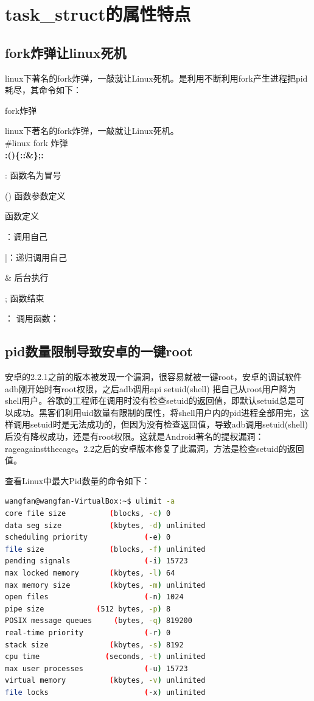  

 



\section{task\_struct的属性特点}
\subsection{fork炸弹让linux死机}
linux下著名的fork炸弹，一敲就让Linux死机。是利用不断利用fork产生进程把pid耗尽，其命令如下：
\begin{example*}
  \wdexpbox
  {\caption{fork炸弹}}
  {linux下著名的fork炸弹，一敲就让Linux死机。\\
  \textcolor[rgb]{1.00,0.00,0.00}{\#linux fork 炸弹}\\  
  \textcolor[rgb]{1.00,0.00,0.00}{\textbf{:()\{:\|:\&\};: } }
  }
\end{example*}

\begin{latexcmd}[label=linux fork 炸弹解析]
: 函数名为冒号

() 函数参数定义

{} 函数定义

：调用自己

|：递归调用自己

& 后台执行

; 函数结束

： 调用函数：
\end{latexcmd}

\subsection{pid数量限制导致安卓的一键root}
安卓的2.2.1之前的版本被发现一个漏洞，很容易就被一键root，安卓的调试软件adb刚开始时有root权限，之后adb调用api setuid(shell) 把自己从root用户降为shell用户。谷歌的工程师在调用时没有检查setuid的返回值，即默认setuid总是可以成功。黑客们利用uid数量有限制的属性，将shell用户内的pid进程全部用完，这样调用setuid时是无法成功的，但因为没有检查返回值，导致adb调用setuid(shell) 后没有降权成功，还是有root权限。这就是Android著名的提权漏洞：rageagainstthecage。2.2之后的安卓版本修复了此漏洞，方法是检查setuid的返回值。

查看Linux中最大Pid数量的命令如下：
\begin{lstlisting}[language={bash}]
wangfan@wangfan-VirtualBox:~$ ulimit -a
core file size          (blocks, -c) 0
data seg size           (kbytes, -d) unlimited
scheduling priority             (-e) 0
file size               (blocks, -f) unlimited
pending signals                 (-i) 15723
max locked memory       (kbytes, -l) 64
max memory size         (kbytes, -m) unlimited
open files                      (-n) 1024
pipe size            (512 bytes, -p) 8
POSIX message queues     (bytes, -q) 819200
real-time priority              (-r) 0
stack size              (kbytes, -s) 8192
cpu time               (seconds, -t) unlimited
max user processes              (-u) 15723
virtual memory          (kbytes, -v) unlimited
file locks                      (-x) unlimited
\end{lstlisting}
